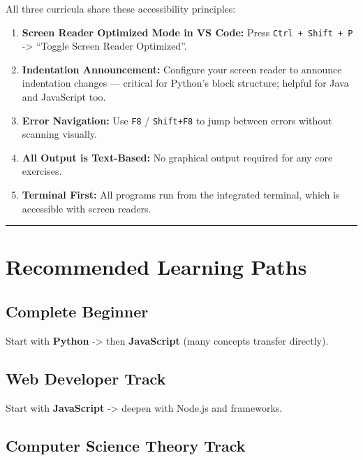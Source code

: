 All three curricula share these accessibility principles:

\begin{enumerate}
\def\labelenumi{\arabic{enumi}.}
\tightlist
\item
  \textbf{Screen Reader Optimized Mode in VS Code:} Press
  \texttt{Ctrl\ +\ Shift\ +\ P} -\textgreater{} ``Toggle Screen Reader
  Optimized''.
\item
  \textbf{Indentation Announcement:} Configure your screen reader to
  announce indentation changes --- critical for Python's block
  structure; helpful for Java and JavaScript too.
\item
  \textbf{Error Navigation:} Use \texttt{F8} / \texttt{Shift+F8} to jump
  between errors without scanning visually.
\item
  \textbf{All Output is Text-Based:} No graphical output required for
  any core exercises.
\item
  \textbf{Terminal First:} All programs run from the integrated
  terminal, which is accessible with screen readers.
\end{enumerate}

\begin{center}\rule{0.5\linewidth}{0.5pt}\end{center}

\section{Recommended Learning Paths}\label{recommended-learning-paths}

\subsection{Complete Beginner}\label{complete-beginner}

Start with \textbf{Python} -\textgreater{} then \textbf{JavaScript}
(many concepts transfer directly).

\subsection{Web Developer Track}\label{web-developer-track}

Start with \textbf{JavaScript} -\textgreater{} deepen with Node.js and
frameworks.

\subsection{Computer Science Theory
Track}\label{computer-science-theory-track}

